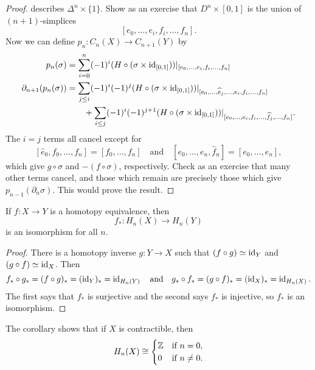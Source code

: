 \begin{proof}
  describes $\Delta^n \times \{1\}$.
  Show as an exercise that $D^n \times [0, 1]$
  is the union of $(n + 1)$-simplices
  \[
    [e_0, \dots, e_i, f_i, \dots, f_n].
  \]
  Now we can define $p_n : C_n(X) \to C_{n + 1}(Y)$
  by
  \begin{align*}
    p_n(\sigma)
    &= \sum_{i = 0}^n (-1)^i (H \circ (\sigma \times \operatorname{id}_{[0, 1]}))|_{[e_0, \dots, e_i, f_i, \dots, f_n]} \\
    \partial_{n + 1}(p_n(\sigma))
    &=
    \sum_{j \le i} (-1)^i (-1)^j (H \circ (\sigma \times \operatorname{id}_{[0, 1]}))|_{[e_0, \dots, \widehat{e}_j, \dots, e_i, f_i, \dots, f_n]} \\
    & \quad \quad + \sum_{i \le j} (-1)^i (-1)^{j + 1} (H \circ (\sigma \times \operatorname{id}_{[0, 1]}))|_{[e_0, \dots, e_i, f_i, \dots, \widehat{f}_j, \dots, f_n]}.
  \end{align*}
  The $i = j$ terms all cancel except for
  \[
    [\widehat{e}_0, f_0, \dots, f_n] = [f_0, \dots, f_n] \quad \text{and} \quad
    [e_0, \dots, e_n, \widehat{f}_n] = [e_0, \dots, e_n],
  \]
  which give $g \circ \sigma$ and
  $-(f \circ \sigma)$, respectively. Check
  as an exercise that many other terms cancel,
  and those which remain are precisely those
  which give $p_{n - 1}(\partial_n \sigma)$.
  This would prove the result.
\end{proof}

\begin{corollary}
  If $f : X \to Y$ is a homotopy equivalence,
  then
  \[f_* : H_n(X) \to H_n(Y)\]
  is an isomorphism for all $n$.
\end{corollary}

\begin{proof}
  There is a homotopy inverse $g : Y \to X$
  such that $(f \circ g) \simeq \operatorname{id}_Y$
  and $(g \circ f) \simeq \operatorname{id}_X$. Then
  \[
    f_* \circ g_* = (f \circ g)_* = (\operatorname{id}_Y)_* = \operatorname{id}_{H_n(Y)}
    \quad \text{and} \quad
    g_* \circ f_* = (g \circ f)_* = (\operatorname{id}_{X})_* = \operatorname{id}_{H_n(X)}.
  \]
  The first says that $f_*$ is surjective and the
  second says $f_*$ is injective, so $f_*$ is
  an isomorphism.
\end{proof}

\begin{remark}
  The corollary shows that if $X$ is contractible,
  then
  \[
    H_n(X)
    \cong
    \begin{cases}
      \mathbb{Z} & \text{if } n = 0, \\
      0 & \text{if } n \ne 0.
    \end{cases}
  \]
\end{remark}
